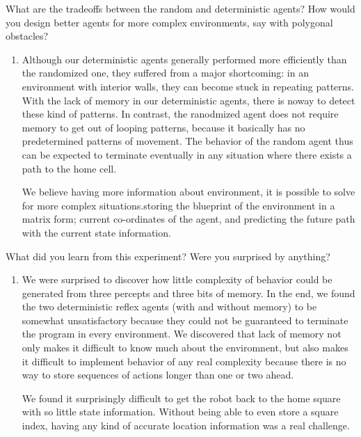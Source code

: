 \documentclass{article}
\newenvironment{Question}[2][Question]{\begin{trivlist}
\item[\hskip \labelsep {\bfseries #1}\hskip \labelsep {\bfseries #2.}]}{\end{trivlist}}
\begin{document}
 \begin{Question}{6}What are the tradeoffs between the random and deterministic agents? How would you design better agents for more complex environments, say with polygonal obstacles?\\
 \begin{enumerate}
 \item Although our deterministic agents generally performed more efficiently than the randomized one, they suffered from a major shortcoming: in an environment with interior walls, they can become stuck in repeating patterns. With the lack of memory in our deterministic agents, there is noway to detect these kind of patterns.  In contrast, the ranodmized agent does not require memory to get out of looping patterns, because it basically has no predetermined patterns of movement. The behavior of the random agent thus can be expected to terminate eventually in any situation where there exists a path to the home cell.
 
 We believe having more information about environment, it is possible to solve for more complex situations.storing the blueprint of the environment in a matrix form; current co-ordinates of the agent, and predicting the future path with the current state information.    
 \end{enumerate}
 \end{Question}

\begin{Question}{7}What did you learn from this experiment? Were you surprised by anything? \\

\begin{enumerate}
 \item We were surprised to discover how little complexity of behavior could be generated from three percepts and three bits of memory. In the end, we found the two deterministic reflex agents (with and without memory) to be somewhat unsatisfactory because they could not be guaranteed to terminate the program in every environment. We discovered that lack of memory not only makes it difficult to know much about the enviromnent, but also makes it difficult to implement behavior of any real complexity because there is no way to store sequences of actions longer than one or two ahead. 
 
We found it surprisingly difficult to get the robot back to the home square with so little state information.  Without being able to even store a square index, having any kind of accurate location information was a real challenge.

\end{enumerate}
\end{Question}
\end{document}
